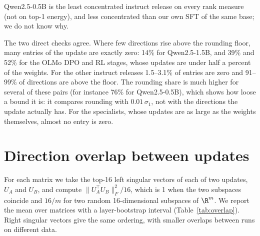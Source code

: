 Qwen2.5-0.5B is the least concentrated instruct release on every rank measure
(not on top-1 energy), and less concentrated than our own SFT of the same
base; we do not know why.

The two direct checks agree. Where few directions rise above the rounding
floor, many entries of the update are exactly zero: 14\% for Qwen2.5-1.5B, and
39\% and 52\% for the OLMo DPO and RL stages, whose updates are under half a
percent of the weights. For the other instruct releases 1.5--3.1\% of entries
are zero and 91--99\% of directions are above the floor. The rounding share is much higher for several
of these pairs (for instance 76\% for Qwen2.5-0.5B), which shows how loose a
bound it is: it compares rounding with $0.01\,\sigma_1$, not with the
directions the update actually has. For the specialists, whose updates are as
large as the weights themselves, almost no entry is zero.

\section{Direction overlap between updates}
\label{app:overlap}

For each matrix we take the top-16 left singular vectors of each of two
updates, $U_A$ and $U_B$, and compute $\|U_A^\top U_B\|_F^2 / 16$, which is 1
when the two subspaces coincide and $16/m$ for two random 16-dimensional
subspaces of $\R^m$. We report the mean over matrices with a layer-bootstrap
interval (Table~\ref{tab:overlap}). Right singular vectors give the same
ordering, with smaller overlaps between runs on different data.

